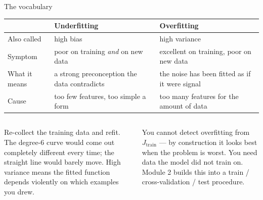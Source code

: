 \documentclass[aspectratio=169,10pt]{beamer}
\begin{document}
\begin{frame}{The vocabulary}
  \footnotesize
  \begin{center}
  \renewcommand{\arraystretch}{1.25}
  \begin{tabular}{@{}L{2.3cm}L{4.3cm}L{4.6cm}@{}}
    \toprule
    & \textbf{Underfitting} & \textbf{Overfitting}\\
    \midrule
    Also called      & high bias & high variance\\
    Symptom          & poor on training \emph{and} on new data & excellent on training,
                       poor on new data\\
    What it means    & a strong preconception the data contradicts &
                       the noise has been fitted as if it were signal\\
    Cause            & too few features, too simple a form & too many features for the
                       amount of data\\
    \bottomrule
  \end{tabular}
  \end{center}
  \begin{columns}[T,onlytextwidth]
    \begin{column}{0.5\textwidth}
      \begin{defnbox}
        \footnotesize Re-collect the training data and refit. The degree-$6$ curve would come
        out completely different every time; the straight line would barely move. High
        variance means the fitted function depends violently on which examples you drew.
      \end{defnbox}
    \end{column}
    \begin{column}{0.46\textwidth}
      \begin{pitfall}
        \footnotesize
        You cannot detect overfitting from $J_{\text{train}}$ --- by construction it looks
        best when the problem is worst. You need data the model did not train on. Module 2
        builds this into a train / cross-validation / test procedure.
      \end{pitfall}
    \end{column}
  \end{columns}
\end{frame}
\end{document}
